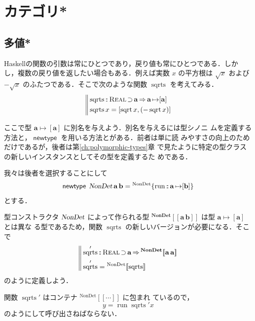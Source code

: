 \documentclass[a5paper,twoside,fleqn,draft]{jsbook}
\def\[{[\![}
\def\]{]\!]}
\newcommand{\programminglanguage}[1]{\textsf{#1}}
\newcommand{\haskell}{\programminglanguage{Haskell}}
\newcommand{\mBrace}{\Vert}
\newcommand{\mKeyword}[1]{\mathsf{#1}}
\newcommand{\mNewTypeDeclKeyword}{\mKeyword{newtype}}
\DeclareMathOperator{\mNewTypeDecl}{\mNewTypeDeclKeyword}
\DeclareMathOperator{\mSuperClass}{\Rightarrow}
\DeclareMathOperator{\mSuperSet}{\supset}
\newcommand{\mSpecialFunc}[1]{#1}
\DeclareMathOperator{\mRun}{\mSpecialFunc{run}}
\DeclareMathOperator{\mSqrt}{\mSpecialFunc{sqrt}}
\DeclareMathOperator{\mSqrts}{\mSpecialFunc{sqrts}}
\DeclareMathOperator{\mIn}{{:\!:}}
\DeclareMathOperator{\mMapsTo}{\mapsto}
\newcommand{\mType}[1]{\mathbf{#1}} %
\newcommand{\mA}{\mType{a}}
\newcommand{\mB}{\mType{b}}
\newcommand{\mTypeAssemble}[2]{{}^{\mType{#1}}\[\mType{#2}\]}
\newcommand{\mTypeConstructor}[1]{\textsl{#1}}
\newcommand{\mValueConstructor}[1]{\mathrm{#1}}
\newcommand{\mValueWith}[2]{{}^\mValueConstructor{#1}\[#2\]}
\newcommand{\mValueRecordWith}[2]{{}^\mValueConstructor{#1}\{#2\}}
\newcommand{\mTypeClass}[1]{\textsc{#1}} %
\newcommand{\mRealTypeClass}{\mTypeClass{Real}}
\begin{document}
\chapter{カテゴリ*}
\label{ch:category}

\section{多値*}

\haskell の関数の引数は常にひとつであり，戻り値も常にひとつである．しか
し，複数の戻り値を返したい場合もある．例えば実数 $x$ の平方根は
$\sqrt{x}$ および $-\sqrt{x}$ のふたつである．そこで次のような関数
$\mSqrts$ を考えてみる．
\begin{equation}
  \left\mBrace
  \begin{aligned}
    &\mSqrts\mIn{}\mRealTypeClass\mSuperSet\mA \mSuperClass
    \mA\mMapsTo[\mA]\\
    &\mSqrts x=[\mSqrt x,(-\mSqrt x)]
  \end{aligned}
  \right.
\end{equation}

ここで型 $\mA\mMapsTo[\mA]$ に別名を与えよう．別名を与えるには型シノニ
ムを定義する方法と，$\mNewTypeDecl$ を用いる方法とがある．前者は単に読
みやすさの向上のためだけであるが，後者は第\ref{ch:polymorphic-types}章
で見たように特定の型クラスの新しいインスタンスとしてその型を定義するた
めである．

我々は後者を選択することにして
\begin{equation}
  \mNewTypeDecl\;
  \mTypeConstructor{NonDet}\,\mA\,\mB
  =\mValueRecordWith{NonDet}{\mRun\mIn\mA\mMapsTo[\mB]}
\end{equation}
とする．

型コンストラクタ $\mTypeConstructor{NonDet}$ によって作られる型
$\mTypeAssemble{NonDet}{\mA\,\mB}$ は型 $\mA\mMapsTo[\mA]$ とは異な
る型であるため，関数 $\mSqrts$ の新しいバージョンが必要になる．そこで
\begin{equation}
  \left\mBrace
  \begin{aligned}
    &\mSqrts'
    \mIn\mRealTypeClass\mSuperSet\mA
    \mSuperClass\mTypeAssemble{NonDet}{\mA\,\mA}\\
    &\mSqrts'
    =\mValueWith{NonDet}{\mSqrts}
  \end{aligned}
  \right.
\end{equation}
のように定義しよう．

関数 $\mSqrts'$ はコンテナ $\mValueWith{NonDet}{\dotsb}$ に包まれ
ているので，
\begin{equation}
  y=\mRun\mSqrts'x
\end{equation}
のようにして呼び出さねばならない．
\end{document}
